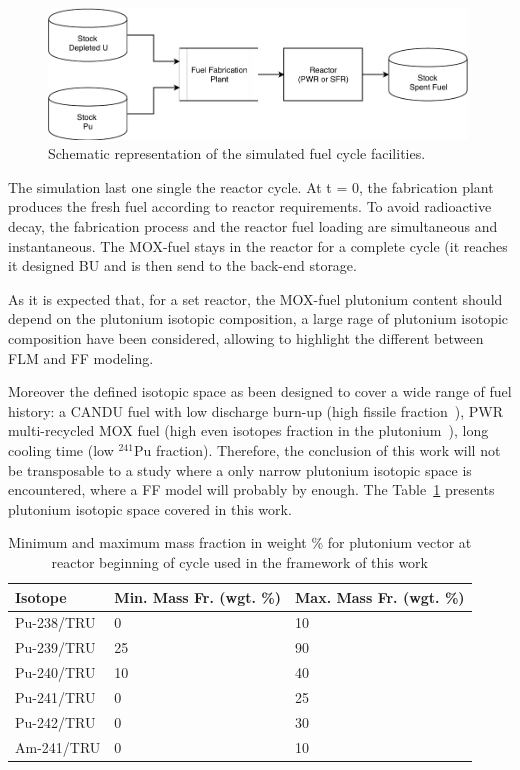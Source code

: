\begin{figure}[h]
    \begin{center}
        \includegraphics[width = 0.99\textwidth]{FIG/FuelCycleDiagram.pdf}
        \caption{Schematic representation of the simulated fuel cycle facilities.}
        \label{fig:FuelCycle}
    \end{center}
\end{figure}

The simulation last one single the reactor cycle.  At t = 0, the fabrication
plant produces the fresh fuel according to reactor requirements. To avoid
radioactive decay, the fabrication process and the reactor fuel loading are
simultaneous and instantaneous. The MOX-fuel stays in the reactor for a complete
cycle (it reaches it designed \gls{BU} and is then send to the back-end storage.


As it is expected that, for a set reactor, the MOX-fuel plutonium content should depend on the
plutonium isotopic composition, a large rage of plutonium isotopic composition
have been considered, allowing to highlight the different between \gls{FLM} and
\gls{FF} modeling.

Moreover the defined isotopic space as been designed to cover a wide range of
fuel history: a CANDU fuel with low discharge burn-up (high fissile
fraction~\cite{Guillemin_2010}), \gls{PWR} multi-recycled MOX fuel (high even
isotopes fraction in the plutonium~\cite{Courtin_2016}), long cooling time (low
$^{241}$Pu fraction). Therefore, the conclusion of this work will not be
transposable to a study where a only narrow plutonium isotopic space is
encountered, where a \gls{FF} model will probably by enough. The
Table~\ref{tab:PuVector} presents plutonium isotopic space covered in this work.

\begin{table}[h]
\centering
\begin{tabular}{ |l|l|l| }
  \hline
  Isotope & Min. Mass Fr. (wgt. \%) & Max. Mass Fr. (wgt. \%) \\
  \hline
  Pu-238/TRU & 0  & 10 \\
  \hline
  Pu-239/TRU & 25 & 90 \\
  \hline
  Pu-240/TRU & 10 & 40 \\
  \hline
  Pu-241/TRU & 0  & 25 \\
  \hline
  Pu-242/TRU & 0  & 30 \\
  \hline
  Am-241/TRU & 0  & 10 \\
  \hline
\end{tabular}
\label{tab:PuVector}
\caption{Minimum and maximum mass fraction in weight \% for plutonium vector at
        reactor beginning of cycle used in the framework of this work}
\end{table}

